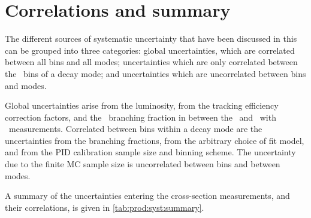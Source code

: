 \section{Correlations and summary}
\label{chap:prod:syst:correlations}

The different sources of systematic uncertainty that have been discussed in
this  can be grouped into three categories:
global uncertainties, which are correlated between all bins and all modes;
uncertainties which are only correlated
between the \pTy\ bins of a decay mode; and uncertainties which are
uncorrelated between bins and modes.

Global uncertainties arise from the luminosity, from the tracking efficiency
correction factors, and the \DzToKpi\ branching fraction in between the
\DzToKpi\ and \DstToDzpi\ with \DzToKpi\ measurements.
Correlated between bins within a decay mode are the uncertainties from the
branching fractions, from the arbitrary choice of fit model, and from the
\ac{PID} calibration sample size and binning scheme.
The uncertainty due to the finite \ac{MC} sample size is uncorrelated between
bins and between modes.

A summary of the uncertainties entering the cross-section measurements, and
their correlations, is given in \cref{tab:prod:syst:summary}.

\begin{sidewaystable}
  \caption{%
    Systematic uncertainties expressed as fractions of the cross-section
    measurements, in percent.
    Uncertainties that are computed bin-by-bin are expressed as ranges giving
    the minimum to maximum values.
    Ranges for the correlations between \pTy\ bins and between modes are also
    given, expressed in percent.
  }
  \label{tab:prod:syst:summary}
  \centering
  
\end{sidewaystable}

\begin{table}
  \caption{%
    Relative uncertainties on the charm cross-sections $\xsec(\PHc)$ due to the
    mis-modelling of the data in the Monte Carlo sample.
  }
  \label{tab:prod:syst:mc:modelling}
  \centering
  
\end{table}

\begin{table}
  \caption{%
    Relative uncertainties on the charm cross-sections $\xsec(\PHc)$ due to the
    finite size of the Monte Carlo sample used to assess the truth matching
    efficiency.
  }
  \label{tab:prod:syst:mc:truth_matching}
  \centering
  
\end{table}
